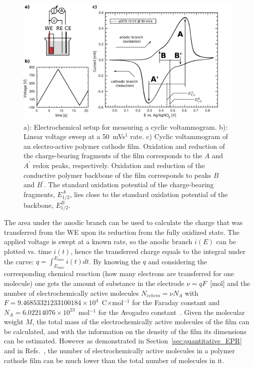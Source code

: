 \begin{figure}[h]
\center
	\includegraphics[width=1\textwidth]{./electrochemistry/figures/CV_pDiTBuS.pdf}
	\caption{a): Electrochemical setup for measuring a cyclic voltammogram. b): Linear voltage sweep at a 50~mVs$^{1}$ rate. c) Cyclic voltammogram of an electro-active polymer cathode film. Oxidation and reduction of the charge-bearing fragments of the film corresponds to the $A$ and $A^\prime$ redox peaks, respectively. Oxidation and reduction of the conductive polymer backbone of the film corresponds to peaks $B$ and $B^\prime$. The standard oxidation potential of the charge-bearing fragments, $E_{1/2}^A$, lies close to the standard oxidation potential of the backbone, $E_{1/2}^B$.}
	\label{fig:CV_DiTBuS}
\end{figure}

The area under the anodic branch can be used to calculate the charge that was transferred from the WE upon its reduction from the fully oxidized state. The applied voltage is swept at a known rate, so the anodic branch $i(E)$ can be plotted vs. time $i(t)$, hence the transferred charge equals to the integral under the curve: $q = \int_{E_{max}}^{E_{min}}i(t)dt$. By knowing the $q$ and considering the corresponding chemical reaction (how many electrons are transferred for one molecule) one gets the amount of substance in the electrode $\nu=qF$~[mol] and the number of electrochemically active molecules $N_{echem}=\nu N_A$ with $F=9.46853321233100184\times10^4$~C$\times$mol$^{-1}$ for the Faraday constant and $N_A=6.02214076\times10^{23}$~mol$^{-1}$ for the Avogadro constant~\cite{NIST}. Given the molecular weight $M$, the total mass of the electrochemically active molecules of the film can be calculated, and with the information on the density of the film its dimensions can be estimated. However as demonstrated in Section~\ref{sec:quantitative_EPR} and in Refs.~\cite{Vereshchagin2022,Kulikov2022,Kulikov2023}, the number of electrochemically active molecules in a polymer cathode film can be much lower than the total number of molecules in it.  


